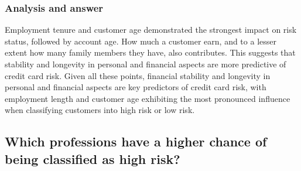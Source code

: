 \documentclass{article}\usepackage[]{graphicx}\usepackage[]{xcolor}
\begin{document}
\subsubsection{Analysis and answer}

Employment tenure and customer age demonstrated the strongest impact on risk status, followed by account age. How much a customer earn, and to a lesser extent how many family members they have, also contributes. This suggests that stability and longevity in personal and financial aspects are more predictive of credit card risk. Given all these points, financial stability and longevity in personal and financial aspects are key predictors of credit card risk, with employment length and customer age exhibiting the most pronounced influence when classifying customers into high risk or low risk.\\


\subsection{Which professions have a higher chance of being classified as high risk?}
\end{document}
